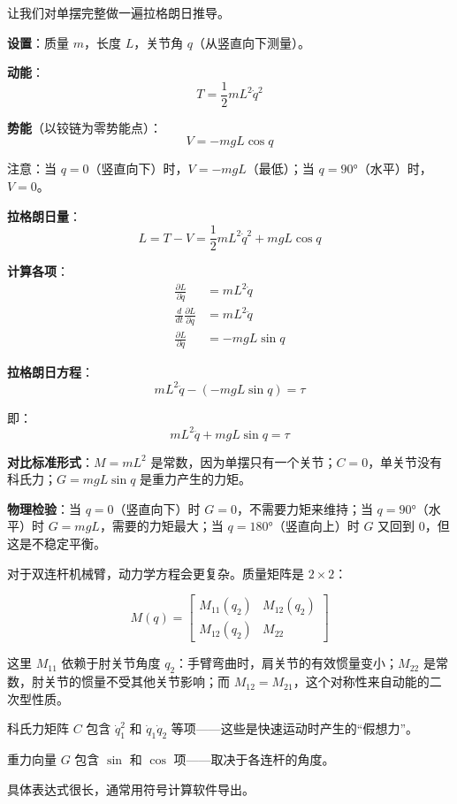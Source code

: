 \begin{example}[单摆的完整推导]
让我们对单摆完整做一遍拉格朗日推导。

\textbf{设置}：质量 $m$，长度 $L$，关节角 $q$（从竖直向下测量）。

\textbf{动能}：
\[
T = \frac{1}{2}mL^2\dot{q}^2
\]

\textbf{势能}（以铰链为零势能点）：
\[
V = -mgL\cos q
\]

注意：当 $q = 0$（竖直向下）时，$V = -mgL$（最低）；当 $q = 90°$（水平）时，$V = 0$。

\textbf{拉格朗日量}：
\[
L = T - V = \frac{1}{2}mL^2\dot{q}^2 + mgL\cos q
\]

\textbf{计算各项}：
\begin{align}
\frac{\partial L}{\partial \dot{q}} &= mL^2\dot{q} \\
\frac{d}{dt}\frac{\partial L}{\partial \dot{q}} &= mL^2\ddot{q} \\
\frac{\partial L}{\partial q} &= -mgL\sin q
\end{align}

\textbf{拉格朗日方程}：
\[
mL^2\ddot{q} - (-mgL\sin q) = \tau
\]

即：
\[
\boxed{mL^2\ddot{q} + mgL\sin q = \tau}
\]

\textbf{对比标准形式}：$M = mL^2$ 是常数，因为单摆只有一个关节；$C = 0$，单关节没有科氏力；$G = mgL\sin q$ 是重力产生的力矩。

\textbf{物理检验}：当 $q = 0$（竖直向下）时 $G = 0$，不需要力矩来维持；当 $q = 90°$（水平）时 $G = mgL$，需要的力矩最大；当 $q = 180°$（竖直向上）时 $G$ 又回到 0，但这是不稳定平衡。
\end{example}

\begin{example}
对于双连杆机械臂，动力学方程会更复杂。质量矩阵是 $2 \times 2$：

\[
M(q) = \begin{bmatrix}
M_{11}(q_2) & M_{12}(q_2) \\
M_{12}(q_2) & M_{22}
\end{bmatrix}
\]

这里 $M_{11}$ 依赖于肘关节角度 $q_2$：手臂弯曲时，肩关节的有效惯量变小；$M_{22}$ 是常数，肘关节的惯量不受其他关节影响；而 $M_{12} = M_{21}$，这个对称性来自动能的二次型性质。

科氏力矩阵 $C$ 包含 $\dot{q}_1^2$ 和 $\dot{q}_1\dot{q}_2$ 等项——这些是快速运动时产生的“假想力”。

重力向量 $G$ 包含 $\sin$ 和 $\cos$ 项——取决于各连杆的角度。

具体表达式很长，通常用符号计算软件导出。
\end{example}

